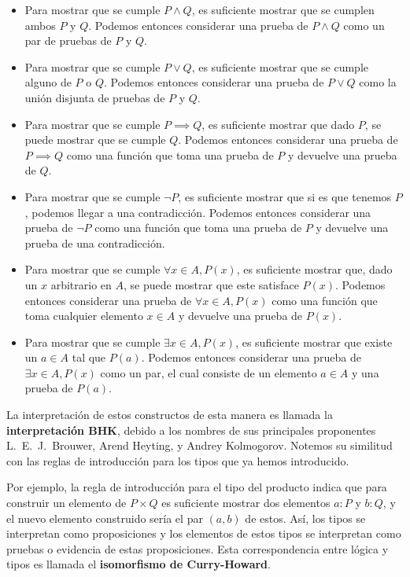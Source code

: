 \documentclass[../main.tex]{subfiles}
\begin{document}
\begin{itemize}
    \item Para mostrar que se cumple $P \wedge Q$, es suficiente mostrar que se cumplen ambos $P$ y $Q$.
          Podemos entonces considerar una prueba de $P \wedge Q$ como un par de pruebas de $P$ y $Q$.
    \item Para mostrar que se cumple $P \vee Q$, es suficiente mostrar que se cumple alguno de $P$ o $Q$.
          Podemos entonces considerar una prueba de $P \vee Q$ como la unión disjunta de pruebas de $P$ y $Q$.
    \item Para mostrar que se cumple $P \implies Q$, es suficiente mostrar que dado $P$, se puede mostrar que se cumple $Q$.
          Podemos entonces considerar una prueba de $P \implies Q$ como una función que toma una prueba de $P$ y devuelve una prueba de $Q$.
    \item Para mostrar que se cumple $\lnot P$, es suficiente mostrar que si es que tenemos $P$, podemos llegar a una contradicción.
          Podemos entonces considerar una prueba de $\lnot P$ como una función que toma una prueba de $P$ y devuelve una prueba de una contradicción.
    \item Para mostrar que se cumple $\forall x\in A, P(x)$, es suficiente mostrar que, dado un $x$ arbitrario en $A$, se puede mostrar que este satisface $P(x)$.
          Podemos entonces considerar una prueba de $\forall x\in A, P(x)$ como una función que toma cualquier elemento $x \in A$ y devuelve una prueba de $P(x)$.
    \item Para mostrar que se cumple $\exists x \in A, P(x)$, es suficiente mostrar que existe un $a \in A$ tal que $P(a)$.
          Podemos entonces considerar una prueba de $\exists x \in A, P(x)$ como un par, el cual consiste de un elemento $a \in A$ y una prueba de $P(a)$.
\end{itemize}

La interpretaci\'on de estos constructos de esta manera es llamada la \textbf{interpretaci\'on BHK},
debido a los nombres de sus principales proponentes L.\ E.\ J.\ Brouwer, Arend Heyting, y Andrey Kolmogorov.
Notemos su similitud con las reglas de introducción para los tipos que ya hemos introducido.

Por ejemplo, la regla de introducción para el tipo del producto indica que para construir un elemento de $P \times Q$ es suficiente mostrar dos elementos $a:P$ y $b:Q$, y el nuevo elemento construido ser\'ia el par $(a,b)$ de estos.
As\'i, los tipos se interpretan como proposiciones y los elementos de estos tipos se interpretan como pruebas o evidencia de estas proposiciones.
Esta correspondencia entre l\'ogica y tipos es llamada el \textbf{isomorfismo de Curry-Howard}.
\end{document}
